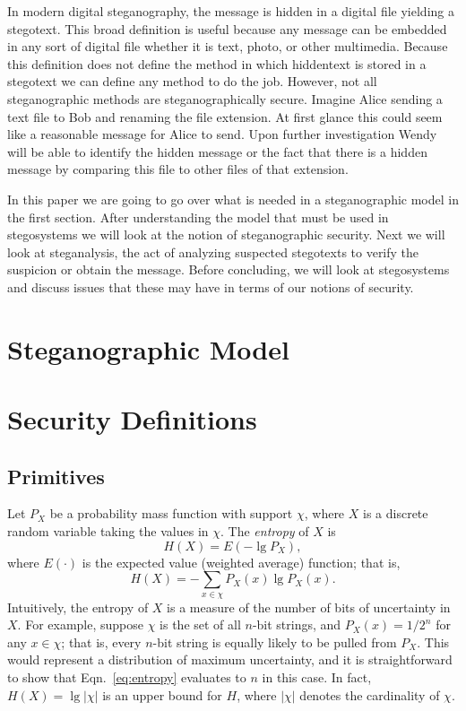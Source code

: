 \documentclass[11pt]{article}
\renewcommand\l{\mathopen{}\left}
\renewcommand\r{\right}
\newcommand\abs[1]{\l\vert #1 \r\vert}
\begin{document}
In modern digital steganography, the message is hidden in a digital
file yielding a stegotext. This broad definition is useful because any
message can be embedded in any sort of digital file whether it is
text, photo, or other multimedia. Because this definition does not
define the method in which hiddentext is stored in a stegotext we can
define any method to do the job. However, not all steganographic
methods are steganographically secure. Imagine Alice sending a text
file to Bob and renaming the file extension. At first glance this
could seem like a reasonable message for Alice to send. Upon further
investigation Wendy will be able to identify the hidden message or the
fact that there is a hidden message by comparing this file to other
files of that extension.

In this paper we are going to go over what is needed in a
steganographic model in the first section. After understanding the
model that must be used in stegosystems we will look at the notion of
steganographic security. Next we will look at steganalysis, the act of
analyzing suspected stegotexts to verify the suspicion or obtain the
message. Before concluding, we will look at stegosystems and discuss
issues that these may have in terms of our notions of security.

\section{Steganographic Model}



\section{Security Definitions}
\subsection{Primitives}
Let $P_X$ be a probability mass function with support $\chi$, where $X$
is a discrete random variable taking the values in $\chi$. The
\emph{entropy} of $X$ is
\begin{equation*}
  H(X) = E\l( -\lg P_X \r),
\end{equation*}
where $E(\cdot)$ is the expected value (weighted average) function;
that is,
\begin{equation}
  H(X) = - \sum_{x\in \chi} P_X(x) \lg P_X(x).
  \label{eq:entropy}
\end{equation}
Intuitively, the entropy of $X$ is a measure of the number of bits of
uncertainty in $X$. For example, suppose $\chi$ is the set of all
$n$-bit strings, and $P_X(x) = 1 / 2^n$ for any $x \in \chi$; that
is, every $n$-bit string is equally likely to be pulled from $P_X$.
This would represent a distribution of maximum uncertainty, and it is
straightforward to show that Eqn.~\eqref{eq:entropy} evaluates to $n$
in this case. In fact, $H(X) = \lg \abs{\chi}$ is an upper bound for
$H$, where $\abs \chi$ denotes the cardinality of $\chi$.
\end{document}
